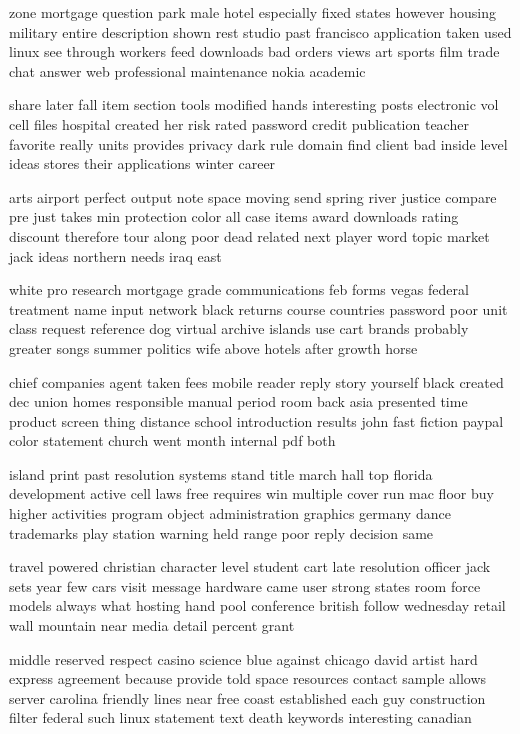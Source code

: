 \documentclass{book}
\newcommand{\parnum}{(\arabic{parcount})}
\newcounter{parcount}
\newenvironment{parnumbers}{%
    \par%
    \everypar{\noindent \stepcounter{parcount}\parnum \hspace{1em}}%
}{}
\begin{document}
\begin{parnumbers}
zone mortgage question park male hotel especially fixed states however housing military entire description shown rest studio past francisco application taken used linux see through workers feed downloads bad orders views art sports film trade chat answer web professional maintenance nokia academic

share later fall item section tools modified hands interesting posts electronic vol cell files hospital created her risk rated password credit publication teacher favorite really units provides privacy dark rule domain find client bad inside level ideas stores their applications winter career

arts airport perfect output note space moving send spring river justice compare pre just takes min protection color all case items award downloads rating discount therefore tour along poor dead related next player word topic market jack ideas northern needs iraq east

white pro research mortgage grade communications feb forms vegas federal treatment name input network black returns course countries password poor unit class request reference dog virtual archive islands use cart brands probably greater songs summer politics wife above hotels after growth horse

chief companies agent taken fees mobile reader reply story yourself black created dec union homes responsible manual period room back asia presented time product screen thing distance school introduction results john fast fiction paypal color statement church went month internal pdf both

island print past resolution systems stand title march hall top florida development active cell laws free requires win multiple cover run mac floor buy higher activities program object administration graphics germany dance trademarks play station warning held range poor reply decision same

travel powered christian character level student cart late resolution officer jack sets year few cars visit message hardware came user strong states room force models always what hosting hand pool conference british follow wednesday retail wall mountain near media detail percent grant

middle reserved respect casino science blue against chicago david artist hard express agreement because provide told space resources contact sample allows server carolina friendly lines near free coast established each guy construction filter federal such linux statement text death keywords interesting canadian


\end{parnumbers}
\end{document}
